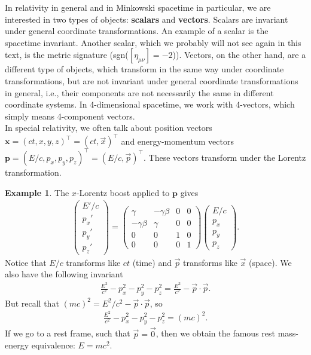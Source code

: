\documentclass{book}
\theoremstyle{definition}
\newtheorem{exmp}{Example}[section]
\newcommand{\p}{\partial}
\begin{document}
In relativity in general and in Minkowski spacetime in particular, we are interested in two types of objects: \textbf{scalars} and \textbf{vectors}. Scalars are invariant under general coordinate transformations. An example of a scalar is the spacetime invariant. Another scalar, which we probably will not see again in this text, is the metric signature (sgn($[\eta_{\mu\nu}] = -2$)). Vectors, on the other hand, are a different type of objects, which transform in the same way under coordinate transformations, but are not invariant under general coordinate transformations in general, i.e., their components are not necessarily the same in different coordinate systems. In 4-dimensional spacetime, we work with 4-vectors, which simply means 4-component vectors.\\

In special relativity, we often talk about position vectors $\mathbf{x} = (ct,x,y,z)^\top = (ct,\vec{x})^\top$ and energy-momentum vectors $\mathbf{p} = (E/c,p_x,p_y,p_z)^\top = (E/c, \vec{p})^\top$. These vectors transform under the Lorentz transformation. 
\begin{exmp}
The $x$-Lorentz boost applied to $\mathbf{p}$ gives
\begin{align*}
\begin{pmatrix}
E'/c\\p_x'\\p_y'\\p_z'
\end{pmatrix}
=
\begin{pmatrix}
\gamma & -\gamma\beta & 0 & 0\\
-\gamma\beta & \gamma & 0 & 0\\
0 & 0 & 1 & 0\\
0 & 0 & 0 & 1
\end{pmatrix}
\begin{pmatrix}
E/c\\p_x\\p_y\\p_z
\end{pmatrix}.
\end{align*}
Notice that $E/c$ transforms like $ct$ (time) and $\vec{p}$ transforms like $\vec{x}$ (space). We also have the following invariant
\begin{align*}
\frac{E^2}{c^2} - p^2_x - p^2_y - p^2_z = \frac{E^2}{c^2} - \vec{p}\cdot\vec{p}.
\end{align*}
But recall that $(mc)^2 = E^2/c^2 - \vec{p}\cdot\vec{p}$, so
\begin{align*}
\frac{E^2}{c^2} - p^2_x - p^2_y - p^2_z = (mc)^2.
\end{align*} 
If we go to a rest frame, such that $\vec{p} = \vec{0}$, then we obtain the famous rest mass-energy equivalence: $E = mc^2$.
\end{exmp}
\end{document}
